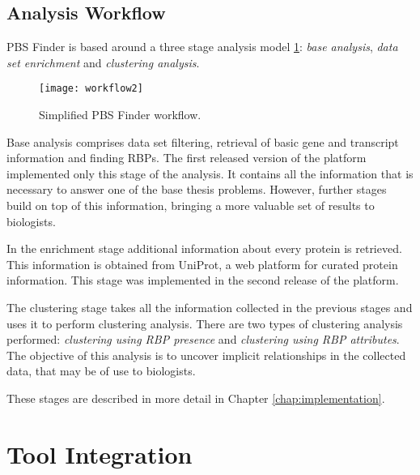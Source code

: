 \subsection{Analysis Workflow}\label{sec:pbsworkflow}

PBS Finder is based around a three stage analysis model \ref{fig:workflow2}:
\emph{base analysis}, \emph{data set enrichment} and \emph{clustering analysis}.

\begin{figure}[!htb]
  \begin{center}
    \leavevmode
    \texttt{[image: workflow2]}
    \caption[Simplified PBS Finder workflow]{
      Simplified PBS Finder workflow.
    }
    \label{fig:workflow2}
  \end{center}
\end{figure}

Base analysis comprises data set filtering, retrieval of basic gene and
transcript information and finding RBPs. The first released version of the
platform implemented only this stage of the analysis. It contains all the
information that is necessary to answer one of the base thesis problems.
However, further stages build on top of this information, bringing a more
valuable set of results to biologists.

In the enrichment stage additional information about every protein is retrieved.
This information is obtained from UniProt, a web platform for curated protein
information. This stage was implemented in the second release of the platform.

The clustering stage takes all the information collected in the previous stages
and uses it to perform clustering analysis. There are two types of clustering
analysis performed: \emph{clustering using RBP presence} and \emph{clustering
using RBP attributes}. The objective of this analysis is to uncover implicit
relationships in the collected data, that may be of use to biologists.

These stages are described in more detail in Chapter \ref{chap:implementation}.

\section{Tool Integration}


